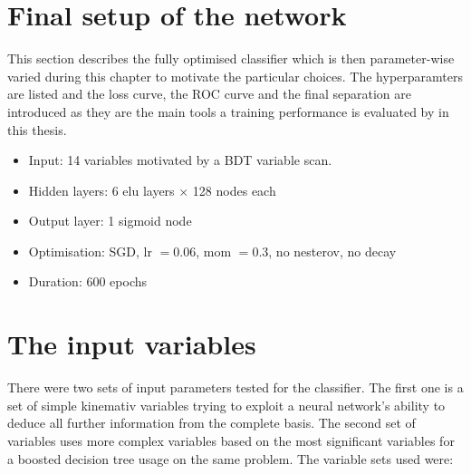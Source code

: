 \section{Final setup of the network}

This section describes the fully optimised classifier which is then parameter-wise varied during this chapter to motivate the particular choices.
The hyperparamters are listed and the loss curve, the ROC curve and the final separation are introduced as they are the main tools a training performance is evaluated by in this thesis.


\begin{itemize}
\item Input: \num{14} variables motivated by a BDT variable scan.
\item Hidden layers: \num{6} elu layers $\times$ \num{128} nodes each
\item Output layer: \num{1} sigmoid node
\item Optimisation: SGD, lr $=0.06$, mom $=0.3$, no nesterov, no decay
\item Duration: 600 epochs
\end{itemize}


\section{The input variables}

There were two sets of input parameters tested for the classifier.
The first one is a set of simple kinemativ variables trying to exploit a neural network's ability to deduce all further information from the complete basis.
The second set of variables uses more complex variables based on the most significant variables for a boosted decision tree usage on the same problem.
The variable sets used were:



